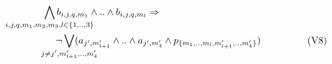 \begin{align}
	\bigwedge\limits_{\mathclap{i,j,q,m_1,m_2,m_3, l \in \{1,..,3\}}} b_{i,j,q,m_1} \land ..\land b_{i,j,q,m_l} \limplies
\mspace{310mu}
  \notag \\
	\qquad \qquad \qquad \qquad
	\neg
\bigvee_{\mathclap{j \neq j^{\prime}, m_{l+1}^{\prime},..,m_{4}^{\prime}}} ( a_{j^{\prime},m_{l+1}^{\prime}} \land .. \land a_{j^{\prime},m_4^{\prime}} \land p_{\{m_1,..,m_l,m^{\prime}_{l+1},..,m^{\prime}_4\}})
\mspace{50mu}
  \tag{V8}\label{eq:fuse2}  
\end{align}





